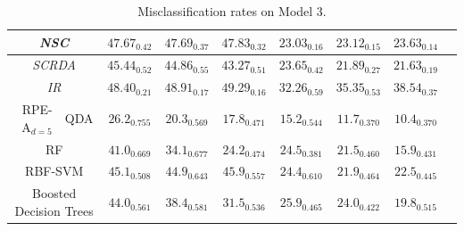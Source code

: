 \documentclass{amsart}
\providecommand{\tabularnewline}{\\}
\begin{document}
\begin{table}[p]
\begin{centering}
\begin{tabular}{r|l|c|c|c|c|c|c|c}
			\hline 
			\multicolumn{2}{c|}{\emph{NSC}} & $\mathit{47.67_{0.42}}$ & $\mathit{47.69_{0.37}}$ & $\mathit{47.83_{0.32}}$ & $\mathit{23.03_{0.16}}$ & $\mathit{23.12_{0.15}}$ & $\mathit{23.63_{0.14}}$ & \tabularnewline
			\hline 
			\multicolumn{2}{c|}{\emph{SCRDA}} & $\mathit{45.44_{0.52}}$ & $\mathit{44.86_{0.55}}$ & $\mathit{43.27_{0.51}}$ & $\mathit{23.65_{0.42}}$ & $\mathit{21.89_{0.27}}$ & $\mathit{21.63_{0.19}}$ & \tabularnewline
			\hline 
			\multicolumn{2}{c|}{\emph{IR}} & $\mathit{48.40_{0.21}}$ & $\mathit{48.91_{0.17}}$ & $\mathit{49.29_{0.16}}$ & $\mathit{32.26_{0.59}}$ & $\mathit{35.35_{0.53}}$ & $\mathit{38.54_{0.37}}$ & \tabularnewline
			\hline 
			\hline 
			RPE-A$_{d=5}$ & QDA & $\mathbf{26.2_{0.755}}$ & $\mathbf{20.3_{0.569}}$ & $\mathbf{17.8_{0.471}}$ & $\mathbf{15.2_{0.544}}$ & $\mathbf{11.7_{0.370}}$ & $\mathbf{10.4_{0.370}}$ & \tabularnewline
			\hline 
			\hline 
			\multicolumn{2}{c|}{RF} & $41.0_{0.669}$ & $34.1_{0.677}$ & $24.2_{0.474}$ & $24.5_{0.381}$ & $21.5_{0.460}$ & $15.9_{0.431}$ & \tabularnewline
			\hline 
			\multicolumn{2}{c|}{RBF-SVM} & $45.1_{0.508}$ & $44.9_{0.643}$ & $45.9_{0.557}$ & $24.4_{0.610}$ & $21.9_{0.464}$ & $22.5_{0.445}$ & \tabularnewline
			\hline 
			\multicolumn{2}{c|}{Boosted Decision Trees} & $44.0_{0.561}$ & $38.4_{0.581}$ & $31.5_{0.536}$ & $25.9_{0.465}$ & $24.0_{0.422}$ & $19.8_{0.515}$ & \tabularnewline
		\end{tabular}\\
		
		\par\end{centering}
	
	\protect\caption{Misclassification rates on Model 3.}
	\label{tab:model-3}
\end{table}
\end{document}

